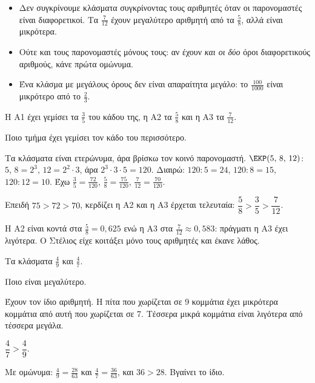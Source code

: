 \begin{prosoxi}
\begin{itemize}[leftmargin=1.2em,itemsep=0.3ex,topsep=2pt]
\item Δεν συγκρίνουμε κλάσματα συγκρίνοντας τους αριθμητές όταν οι παρονομαστές είναι διαφορετικοί. Τα $\frac{7}{12}$ έχουν μεγαλύτερο αριθμητή από τα $\frac{5}{8}$, αλλά είναι μικρότερα.
\item Ούτε και τους παρονομαστές μόνους τους: αν έχουν \emph{και οι δύο} όροι διαφορετικούς αριθμούς, κάνε πρώτα ομώνυμα.
\item Ένα κλάσμα με μεγάλους όρους δεν είναι απαραίτητα μεγάλο: το $\frac{100}{1000}$ είναι μικρότερο από το $\frac{2}{3}$.
\end{itemize}
\end{prosoxi}


\tixero Η Α1 έχει γεμίσει τα $\frac{3}{5}$ του κάδου της, η Α2 τα $\frac{5}{8}$ και η Α3 τα $\frac{7}{12}$.\par
\tithelo Ποιο τμήμα έχει γεμίσει τον κάδο του περισσότερο.\par
\possindeo Τα κλάσματα είναι ετερώνυμα, άρα βρίσκω τον κοινό παρονομαστή. $\EKP(5,\,8,\,12)$: $5$, $8=2^3$, $12=2^2\cdot 3$, άρα $2^3\cdot 3\cdot 5=120$. Διαιρώ: $120:5=24$, $120:8=15$, $120:12=10$. Έχω $\frac{3}{5}=\frac{72}{120}$, $\frac{5}{8}=\frac{75}{120}$, $\frac{7}{12}=\frac{70}{120}$.\par
\apantisi Επειδή $75>72>70$, κερδίζει η Α2 και η Α3 έρχεται τελευταία: $\dfrac{5}{8}>\dfrac{3}{5}>\dfrac{7}{12}$.\par
\elegxos Η Α2 είναι κοντά στα $\frac{5}{8}=0{,}625$ ενώ η Α3 στα $\frac{7}{12}\approx 0{,}583$: πράγματι η Α3 έχει λιγότερα. Ο Στέλιος είχε κοιτάξει μόνο τους αριθμητές και έκανε λάθος.

\tixero Τα κλάσματα $\frac{4}{9}$ και $\frac{4}{7}$.\par
\tithelo Ποιο είναι μεγαλύτερο.\par
\possindeo Έχουν τον ίδιο αριθμητή. Η πίτα που χωρίζεται σε 9 κομμάτια έχει μικρότερα κομμάτια από αυτή που χωρίζεται σε 7. Τέσσερα μικρά κομμάτια είναι λιγότερα από τέσσερα μεγάλα.\par
\apantisi $\dfrac{4}{7}>\dfrac{4}{9}$.\par
\elegxos Με ομώνυμα: $\frac{4}{9}=\frac{28}{63}$ και $\frac{4}{7}=\frac{36}{63}$, και $36>28$. Βγαίνει το ίδιο.

